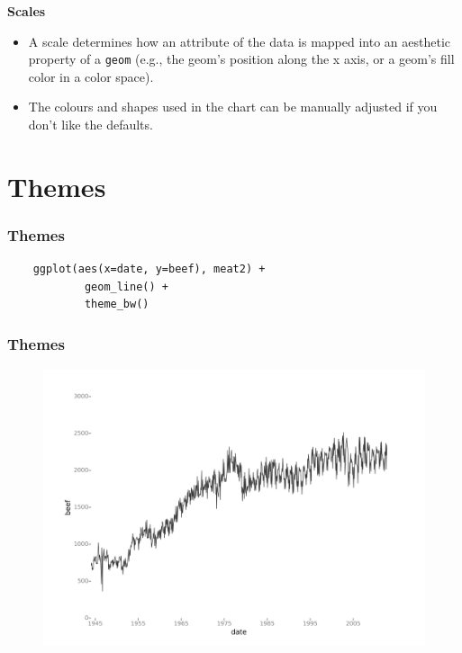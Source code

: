 \documentclass{beamer}
\begin{document}
\begin{frame}
	\Large
		\vspace{-0.7cm}
	\noindent \textbf{Scales}
	\begin{itemize}
		\item A scale determines how an attribute of the data is mapped into an aesthetic property of a \texttt{geom} (e.g., the geom's position along the x axis, or a geom's fill color in a color space).
		\item The colours and shapes used in the chart can be manually adjusted if you don’t like the defaults.
	\end{itemize}
	
\end{frame}
\section{Themes}
\begin{frame}[fragile]
\frametitle{Themes}
\Large
	\begin{framed}
	\begin{verbatim}
	ggplot(aes(x=date, y=beef), meat2) +
			geom_line() +
			theme_bw()
	\end{verbatim}
	\end{framed}
\end{frame}
\begin{frame}
\frametitle{Themes}
\Large
\begin{figure}
\centering
\includegraphics[width=1.0\linewidth]{meat_theme_bw}
\end{figure}

\end{frame}
\end{document}
